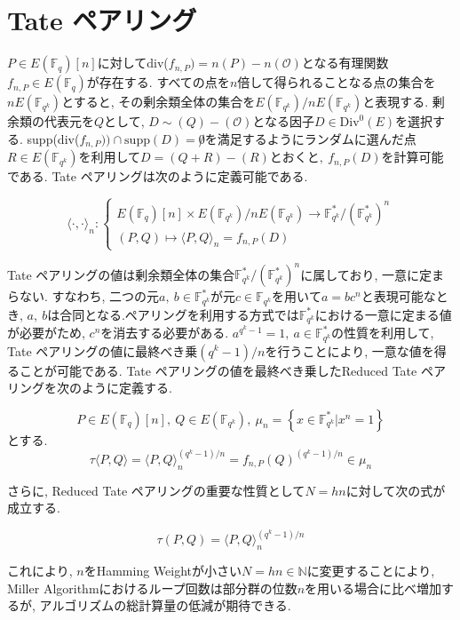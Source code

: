 \section{Tate ペアリング}
\par
$P \in E(\mathbb{F}_q)[n]$に対してdiv($f_{n, P})=n(P)-n(\mathcal{O})$となる有理関数$f_{n,P} \in E(\mathbb{F}_q)$が存在する. すべての点を$n$倍して得られることなる点の集合を$nE(\mathbb{F}_{q^k})$とすると, その剰余類全体の集合を$E(\mathbb{F}_{q^k})/nE(\mathbb{F}_{q^k})$と表現する. 剰余類の代表元を$Q$として, $D \sim (Q) - (\mathcal{O})$となる因子$D \in \mbox{Div}^0(E)$を選択する. supp(div($f_{n, P})) \cap \mbox{supp} (D) = \not 0$を満足するようにランダムに選んだ点$R \in E(\mathbb{F}_{q^k})$を利用して$D=(Q + R) - (R)とおくと,\ f_{n,P}(D)$を計算可能である. Tate ペアリングは次のように定義可能である. 
\par
\[
\langle \cdot,\cdot\rangle_n:
\left\{
\begin{array}{l}
E(\mathbb{F}_q)[n] \times E(\mathbb{F}_{q^k})/nE(\mathbb{F}_{q^k}) \to \mathbb{F}_{q^k}^\ast /(\mathbb{F}_{q^k}^\ast)^n\\
(P,Q) \mapsto \langle P, Q \rangle _n = f_{n,P}(D)
\end{array}
\right.
\]
\par
Tate ペアリングの値は剰余類全体の集合$\mathbb{F}_{q^k}^\ast/(\mathbb{F}_{q^k}^\ast)^n$に属しており, 一意に定まらない. すなわち, 二つの元$a,\ b \in \mathbb{F}_{q^k}^\ast が元c \in \mathbb{F}_{q^k}を用いてa = bc^n$と表現可能なとき, $a,\ b$は合同となる.ペアリングを利用する方式では$\mathbb{F}_{q^k}^\ast$における一意に定まる値が必要がため, $c^n$を消去する必要がある. $a^{q^k - 1} = 1,\ a \in \mathbb{F}_{q^k}^\ast$の性質を利用して, Tate ペアリングの値に最終べき乗$(q^k - 1) / n$を行うことにより, 一意な値を得ることが可能である. Tate ペアリングの値を最終べき乗したReduced Tate ペアリングを次のように定義する. 
\par
\[
P \in E(\mathbb{F}_q)[n],\ Q \in E(\mathbb{F}_{q^k}),\ \mu_n = \left\{ x \in \mathbb{F}_{q^k}^\ast | x^n = 1 \right\}
\]
とする. \\
\[
\tau \langle P,Q \rangle = \langle P,Q \rangle _n^{(q^k - 1) / n} = f_{n,P}(Q)^{(q^k - 1) / n} \in \mu_n
\]
\par
さらに, Reduced Tate ペアリングの重要な性質として$N = hn$に対して次の式が成立する. 
\par
\[
\tau(P,Q) = \langle P,Q \rangle _n^{(q^k - 1) / n}
\]
\par
これにより, $n$をHamming Weightが小さい$N = hn \in \mathbb{N}$に変更することにより, Miller Algorithmにおけるループ回数は部分群の位数$n$を用いる場合に比べ増加するが, アルゴリズムの総計算量の低減が期待できる. 
